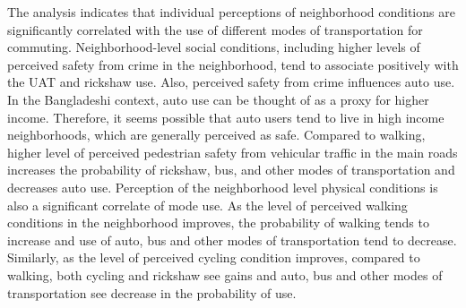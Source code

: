 \documentclass[]{elsarticle} %
\begin{document}
The analysis indicates that individual perceptions of neighborhood
conditions are significantly correlated with the use of different modes
of transportation for commuting. Neighborhood-level social conditions,
including higher levels of perceived safety from crime in the
neighborhood, tend to associate positively with the UAT and rickshaw
use. Also, perceived safety from crime influences auto use. In the
Bangladeshi context, auto use can be thought of as a proxy for higher
income. Therefore, it seems possible that auto users tend to live in
high income neighborhoods, which are generally perceived as safe.
Compared to walking, higher level of perceived pedestrian safety from
vehicular traffic in the main roads increases the probability of
rickshaw, bus, and other modes of transportation and decreases auto use.
Perception of the neighborhood level physical conditions is also a
significant correlate of mode use. As the level of perceived walking
conditions in the neighborhood improves, the probability of walking
tends to increase and use of auto, bus and other modes of transportation
tend to decrease. Similarly, as the level of perceived cycling condition
improves, compared to walking, both cycling and rickshaw see gains and
auto, bus and other modes of transportation see decrease in the
probability of use.
\end{document}

